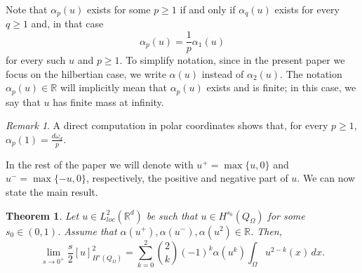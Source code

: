 \documentclass[reqno,11pt]{amsart}
\numberwithin{equation}{section}
\theoremstyle{definition} %
\theoremstyle{plain}
\newtheorem{theo}[theo]{Theorem}  %
\theoremstyle{definition}
\theoremstyle{remark}
\newtheorem{remark}[remark]{Remark}
\def\Qom{{Q_\Omega}}
\def\R{\mathbb{R}}
\begin{document}
{Note that $\alpha_p(u)$ exists for some $p\geq 1$ if and only if $\alpha_q(u)$ exists for every $q\geq 1$ and, in that case 
\begin{equation}\label{eq:alpha1_alphap}
    \alpha_p(u)=\frac1p\alpha_1(u)
\end{equation}
for every such $u$ and $p\geq 1$.
To simplify notation, since  in the present paper we focus on the hilbertian case, we write $\alpha(u)$ instead of $\alpha_2(u)$. The notation $\alpha_p(u)\in \R$ will implicitly mean that $\alpha_p(u)$ exists and is finite; in this case, we say that $u$ has finite mass at infinity.

\begin{remark}
    \label{rk:alpha1}
    A direct computation in polar coordinates shows that, for every $p\geq 1$, $\alpha_p(1)=\frac{d\omega_d}{p}$.
\end{remark}

In the rest of the paper we will denote with $u^+=\max\{u,0\}$ and $u^-=\max\{-u,0\}$, respectively, the positive and negative part of $u$. We can now state the main result.

\begin{theo}
    \label{Theo:MS pointwise:euclidean}
    Let $u\in L^2_{loc}(\R^d)$ be such that $u\in H^{s_0}(\Qom)$ for some ${s_0\in(0,1)}$.
    Assume that $\alpha(u^+), \alpha(u^-), \alpha(u^2)\in \R$. 
    Then,
    \begin{equation}
        \label{Eq:intro:ExtMS:pw:eucl}
        \lim_{s\to 0^+}\frac{s}{2}[u]^2_{H^s(\Qom)}=\sum_{k=0}^{2}\binom{2}{k}(-1)^k\alpha(u^k)\int_\Omega u^{2-k}(x)\,dx.
    \end{equation}
\end{theo}

}
\end{document}
